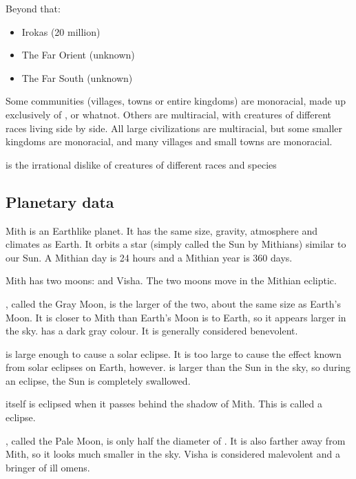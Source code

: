 Beyond that: 

\begin{itemize}
  \item Irokas (20 million) 
  \item The Far Orient (unknown) 
  \item The Far South (unknown) 
\end{itemize}

Some communities (villages, towns or entire kingdoms) are monoracial, made up exclusively of \humans{}, \meccara{} or whatnot. Others are multiracial, with creatures of different races living side by side. All large civilizations are multiracial, but some smaller kingdoms are monoracial, and many villages and small towns are monoracial. 

 is the irrational dislike of creatures of different races and species



\subsection{Planetary data}
Mith is an Earthlike planet. It has the same size, gravity, atmosphere and climates as Earth. It orbits a star (simply called the Sun by Mithians) similar to our Sun. A Mithian day is 24 hours and a Mithian year is 360 days. 

Mith has two moons: \Dun{} and Visha. The two moons move in the Mithian ecliptic. 

\label{Gray Moon}
, called the Gray Moon, is the larger of the two, about the same size as Earth's Moon. It is closer to Mith than Earth's Moon is to Earth, so it appears larger in the sky. \Dun{} has a dark gray colour. It is generally considered benevolent. 

\Dun{} is large enough to cause a solar eclipse. It is too large to cause the  effect known from solar eclipses on Earth, however. \Dun{} is larger than the Sun in the sky, so during an eclipse, the Sun is completely swallowed. 

\Dun{} itself is eclipsed when it passes behind the shadow of Mith. This is called a \Dun{} eclipse. 

\label{Pale Moon}
, called the Pale Moon, is only half the diameter of \Dun{}. It is also farther away from Mith, so it looks much smaller in the sky. Visha is considered malevolent and a bringer of ill omens. 

